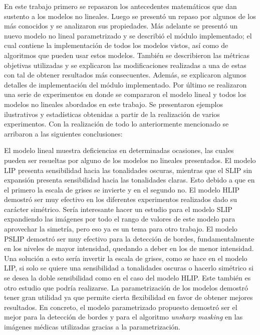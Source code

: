 \begin{conclusions}
    En este trabajo primero se repasaron los antecedentes matem\'aticos que dan sustento a los modelos no lineales. Luego se present\'o un repaso por algunos de los m\'as conocidos y se analizaron sus propiedades. M\'as adelante se present\'o un nuevo modelo no lineal parametrizado y se describi\'o el m\'odulo implementado; el cual contiene la implementaci\'on de todos los modelos vistos, as\'i como de algoritmos que pueden usar estos modelos. Tambi\'en se describieron las m\'etricas objetivas utilizadas y se explicaron las modificaciones realizadas a una de estas con tal de obtener resultados m\'as consecuentes. Adem\'as, se explicaron algunos detalles de implementaci\'on del m\'odulo implementado. Por \'ultimo se realizaron una serie de experimentos en donde se compararon el modelo lineal y todos los modelos no lineales abordados en este trabajo. Se presentaron ejemplos ilustrativos y estad\'isticas obtenidas a partir de la realizaci\'on de varios experimentos. Con la realizaci\'on de todo lo anteriormente mencionado se arribaron a las siguientes conclusiones:
    
    El modelo lineal muestra deficiencias en determinadas ocasiones, las cuales pueden ser resueltas por alguno de los modelos no lineales presentados. El modelo LIP presenta sensibilidad hacia las tonalidades oscuras, mientras que el SLIP sin expansi\'on presenta sensibilidad hacia las tonalidades claras. Esto debido a que en el primero la escala de grises se invierte y en el segundo no. El modelo HLIP demostr\'o ser muy efectivo en los diferentes experimentos realizados dado su car\'acter sim\'etrico. Ser\'ia interesante hacer un estudio para el modelo SLIP expandiendo las im\'agenes por todo el rango de valores de este modelo para aprovechar la simetr\'ia, pero eso ya es un tema para otro trabajo. El modelo PSLIP demostr\'o ser muy efectivo para la detecci\'on de bordes, fundamentalmente en los niveles de mayor intensidad, quedando a deber en los de menor intensidad. Una soluci\'on a esto ser\'ia invertir la escala de grises, como se hace en el modelo LIP, si solo se quiere una sensibilidad a tonalidades oscuras o hacerlo sim\'etrico si se desea la doble sensibilidad como en el caso del modelo HLIP. Este tambi\'en es otro estudio que podr\'ia realizarse. La parametrizaci\'on de los modelos demostr\'o tener gran utilidad ya que permite cierta flexibilidad en favor de obtener mejores resultados. En concreto, el modelo parametrizado propuesto demostr\'o ser el mejor para la detecci\'on de bordes y para el algoritmo \textit{unsharp masking} en las im\'agenes m\'edicas utilizadas gracias a la parametrizaci\'on.
    

\end{conclusions}
